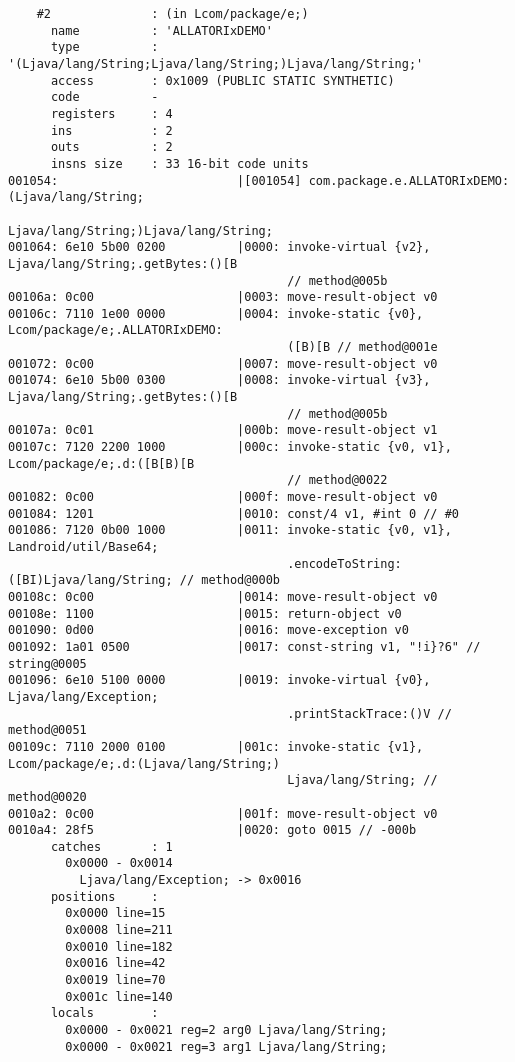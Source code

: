\begin{lstlisting}
    #2              : (in Lcom/package/e;)
      name          : 'ALLATORIxDEMO'
      type          : '(Ljava/lang/String;Ljava/lang/String;)Ljava/lang/String;'
      access        : 0x1009 (PUBLIC STATIC SYNTHETIC)
      code          -
      registers     : 4
      ins           : 2
      outs          : 2
      insns size    : 33 16-bit code units
001054:                         |[001054] com.package.e.ALLATORIxDEMO:(Ljava/lang/String;
                                          Ljava/lang/String;)Ljava/lang/String;
001064: 6e10 5b00 0200          |0000: invoke-virtual {v2}, Ljava/lang/String;.getBytes:()[B
                                       // method@005b
00106a: 0c00                    |0003: move-result-object v0
00106c: 7110 1e00 0000          |0004: invoke-static {v0}, Lcom/package/e;.ALLATORIxDEMO:
                                       ([B)[B // method@001e
001072: 0c00                    |0007: move-result-object v0
001074: 6e10 5b00 0300          |0008: invoke-virtual {v3}, Ljava/lang/String;.getBytes:()[B
                                       // method@005b
00107a: 0c01                    |000b: move-result-object v1
00107c: 7120 2200 1000          |000c: invoke-static {v0, v1}, Lcom/package/e;.d:([B[B)[B
                                       // method@0022
001082: 0c00                    |000f: move-result-object v0
001084: 1201                    |0010: const/4 v1, #int 0 // #0
001086: 7120 0b00 1000          |0011: invoke-static {v0, v1}, Landroid/util/Base64;
                                       .encodeToString:([BI)Ljava/lang/String; // method@000b
00108c: 0c00                    |0014: move-result-object v0
00108e: 1100                    |0015: return-object v0
001090: 0d00                    |0016: move-exception v0
001092: 1a01 0500               |0017: const-string v1, "!i}?6" // string@0005
001096: 6e10 5100 0000          |0019: invoke-virtual {v0}, Ljava/lang/Exception;
                                       .printStackTrace:()V // method@0051
00109c: 7110 2000 0100          |001c: invoke-static {v1}, Lcom/package/e;.d:(Ljava/lang/String;)
                                       Ljava/lang/String; // method@0020
0010a2: 0c00                    |001f: move-result-object v0
0010a4: 28f5                    |0020: goto 0015 // -000b
      catches       : 1
        0x0000 - 0x0014
          Ljava/lang/Exception; -> 0x0016
      positions     :
        0x0000 line=15
        0x0008 line=211
        0x0010 line=182
        0x0016 line=42
        0x0019 line=70
        0x001c line=140
      locals        :
        0x0000 - 0x0021 reg=2 arg0 Ljava/lang/String;
        0x0000 - 0x0021 reg=3 arg1 Ljava/lang/String;


\end{lstlisting}
